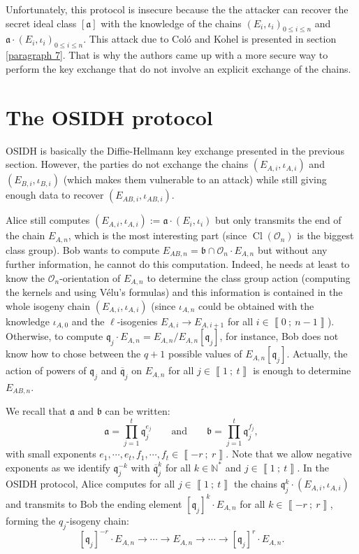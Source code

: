 \documentclass[a4paper,10pt]{report}
\theoremstyle{definition}
\theoremstyle{plain}
\theoremstyle{definition}
\newcommand{\N}{\mathbb{N}}
\newcommand{\mO}{\mathcal{O}}
\renewcommand{\i}[2]{\left\llbracket #1~;~#2\right\rrbracket}
\renewcommand{\(}{\left(}
\renewcommand{\)}{\right)}
\newcommand{\mf}[1]{\mathfrak{#1}}
\newcommand{\mfq}{\mathfrak{q}}
\DeclareMathOperator{\Cl}{Cl}
\begin{document}
Unfortunately, this protocol is insecure because the the attacker can recover the secret ideal class $[\mf{a}]$ with the knowledge of the chains $(E_i,\iota_i)_{0\leq i\leq n}$ and $\mf{a}\cdot(E_i,\iota_i)_{0\leq i\leq n}$.  This attack due to Col\'{o} and Kohel \cite[§ 5.1]{OSIDH} is presented in section \ref{paragraph 7}.  That is why the authors came up with a more secure way to perform the key exchange that do not involve an explicit exchange of the chains.

\section{The OSIDH protocol}\label{paragraph 8}

OSIDH is basically the Diffie-Hellmann key exchange presented in the previous section. However,  the parties do not exchange the chains $(E_{A,i},\iota_{A,i})$ and $(E_{B,i},\iota_{B,i})$ (which makes them vulnerable to an attack) while still giving enough data to recover $(E_{AB,i},\iota_{AB,i})$.  

Alice still computes $(E_{A,i},\iota_{A,i}):=\mf{a}\cdot (E_i,\iota_i)$ but only transmits the end of the chain $E_{A,n}$, which is the most interesting part (since $\Cl(\mO_n)$ is the biggest class group).  Bob wants to compute $E_{AB,n}=\mf{b}\cap\mO_n\cdot E_{A,n}$ but without any further information, he cannot do this computation. Indeed, he needs at least to know the $\mO_n$-orientation of $E_{A,n}$ to determine the class group action (computing the kernels and using V\'{e}lu's formulas) and this information is contained in the whole isogeny chain $(E_{A,i},\iota_{A,i})$ (since $\iota_{A,n}$ could be obtained with the knowledge $\iota_{A,0}$ and the $\ell$-isogenies $E_{A,i}\longrightarrow E_{A,i+1}$ for all $i\in\i{0}{n-1}$). Otherwise, to compute $\mfq_j\cdot E_{A,n}=E_{A,n}/E_{A,n}[\mfq_j]$, for instance, Bob does not know how to chose between the $q+1$ possible values of $E_{A,n}[\mfq_j]$.  Actually, the action of powers of $\mfq_j$ and $\overline{\mfq}_j$ on $E_{A,n}$ for all $j\in\i{1}{t}$ is enough to determine $E_{AB,n}$.

We recall that $\mf{a}$ and $\mf{b}$ can be written:
\[\mf{a}=\prod_{j=1}^t \mf{q}_j^{e_j} \qquad \mbox{and} \qquad \mf{b}=\prod_{j=1}^t \mf{q}_j^{f_j},\]
with small exponents $e_1,\cdots,e_t, f_1,\cdots,f_t\in\i{-r}{r}$.  Note that we allow negative exponents as we identify $\mf{q}_j^{-k}$ with $\overline{\mf{q}}_j^{k}$ for all $k\in\N^*$ and $j\in\i{1}{t}$.  In the OSIDH protocol, Alice computes for all $j\in\i{1}{t}$ the chains $\mfq_j^k\cdot (E_{A,i},\iota_{A,i})$ and transmits to Bob the ending element $[\mfq_j]^k\cdot E_{A,n}$ for all $k\in\i{-r}{r}$, forming the $q_j$-isogeny chain:
\[[\mfq_j]^{-r}\cdot E_{A,n}\longrightarrow \cdots \longrightarrow E_{A,n}\longrightarrow \cdots\longrightarrow [\mfq_j]^{r}\cdot E_{A,n}.\]
\end{document}

